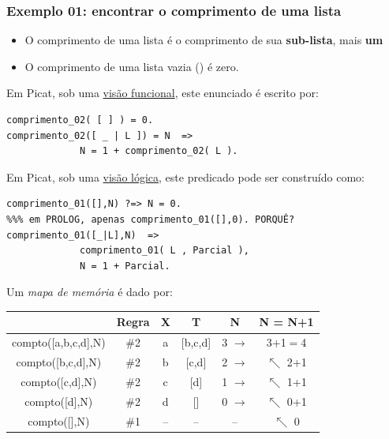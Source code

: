 \begin{frame}[fragile, allowframebreaks=0.9]
\frametitle{Exemplo 01: encontrar o comprimento de uma lista}
 
\begin{itemize}
   \item O comprimento de uma lista é o comprimento de sua \textbf{sub-lista}, mais \textbf{um}
   \item O comprimento de uma lista vazia (\lbrack  \rbrack) é zero.
 \end{itemize} 
 
Em Picat, sob uma \underline{visão funcional}, este enunciado é escrito por:

\begin{verbatim}
comprimento_02( [ ] ) = 0.
comprimento_02([ _ | L ]) = N  => 
             N = 1 + comprimento_02( L ).
\end{verbatim}

\framebreak

Em Picat, sob uma \underline{visão lógica}, este predicado 
pode ser construído como:

\begin{verbatim}
comprimento_01([],N) ?=> N = 0. 
%%% em PROLOG, apenas comprimento_01([],0). PORQUÊ?
comprimento_01([_|L],N)  => 
             comprimento_01( L , Parcial ), 
             N = 1 + Parcial.
\end{verbatim}

\framebreak
Um {\em mapa de memória} é dado por:

\begin{center}
\begin{tabular}[c]{|c|c|c|c|c|c|}
\hline
& Regra & X & T & N & N = N+1\\\hline
compto([a,b,c,d],N) & \#2 & a & [b,c,d] & 3 $\rightarrow$ & 3+1$=$4\\\hline
compto([b,c,d],N) & \#2 & b & [c,d] & 2 $\rightarrow$ & $\nwarrow$ 2+1\\\hline
compto([c,d],N) & \#2 & c & [d] & 1 $\rightarrow$ & $\nwarrow$ 1+1\\\hline
compto([d],N) & \#2 & d & [] & 0 $\rightarrow$ & $\nwarrow$ 0+1\\\hline
compto([],N) & \#1 & -- & -- & -- & $\nwarrow$ 0\\\hline
\end{tabular}
\end{center}
 
 \end{frame}

